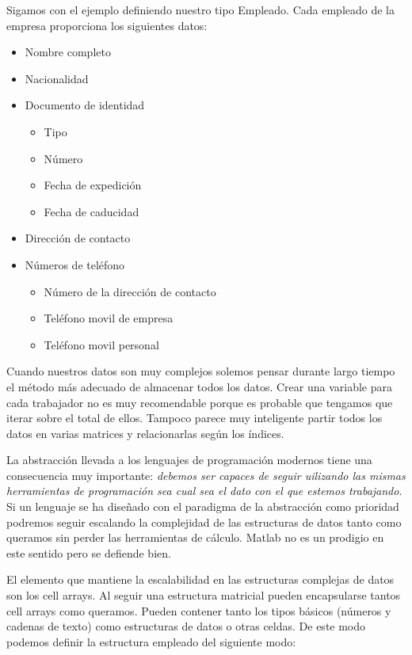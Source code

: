 Sigamos con el ejemplo definiendo nuestro tipo Empleado.  Cada empleado
de la empresa proporciona los siguientes datos:

\begin{itemize}
\item Nombre completo
\item Nacionalidad
\item Documento de identidad
\begin{itemize}
\item Tipo
\item Número
\item Fecha de expedición
\item Fecha de caducidad
\end{itemize}
\item Dirección de contacto
\item Números de teléfono
\begin{itemize}
\item Número de la dirección de contacto
\item Teléfono movil de empresa
\item Teléfono movil personal
\end{itemize}
\end{itemize}

Cuando nuestros datos son muy complejos solemos pensar durante largo
tiempo el método más adecuado de almacenar todos los datos.  Crear una
variable para cada trabajador no es muy recomendable porque es probable
que tengamos que iterar sobre el total de ellos.  Tampoco parece muy
inteligente partir todos los datos en varias matrices y relacionarlas
según los índices.

La abstracción llevada a los lenguajes de programación modernos tiene
una consecuencia muy importante:  \emph{debemos ser capaces de seguir
uilizando las mismas herramientas de programación sea cual sea el dato
con el que estemos trabajando}.  Si un lenguaje se ha diseñado con el
paradigma de la abstracción como prioridad podremos seguir escalando
la complejidad de las estructuras de datos tanto como queramos sin perder
las herramientas de cálculo.  Matlab no es un prodigio en este sentido
pero se defiende bien.

El elemento que mantiene la escalabilidad en las estructuras complejas
de datos son los cell arrays.  Al seguir una estructura matricial pueden
encapsularse tantos cell arrays como queramos.  Pueden contener tanto los
tipos básicos (números y cadenas de texto) como estructuras de datos
o otras celdas.  De este modo podemos definir la estructura empleado
del siguiente modo:

